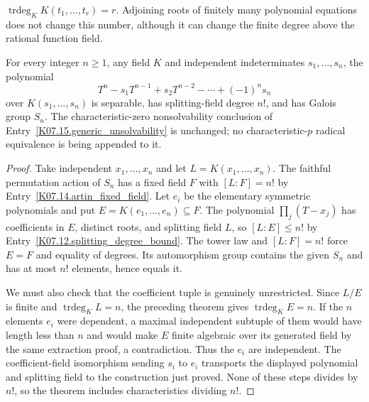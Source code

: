 \begin{example}
$\operatorname{trdeg}_K K(t_1,\ldots,t_r)=r$. Adjoining roots of finitely many polynomial equations does not change this number, although it can change the finite degree above the rational function field.
\end{example}

\begin{theorem}
For every integer $n\geq1$, any field $K$ and independent indeterminates $s_1,\ldots,s_n$, the polynomial
\[T^n-s_1T^{n-1}+s_2T^{n-2}-\cdots+(-1)^n s_n\]
over $K(s_1,\ldots,s_n)$ is separable, has splitting-field degree $n!$, and has Galois group $S_n$. The characteristic-zero nonsolvability conclusion of Entry~\ref{K07.15.generic_unsolvability} is unchanged; no characteristic-$p$ radical equivalence is being appended to it.
\end{theorem}
\begin{proof}
Take independent $x_1,\ldots,x_n$ and let $L=K(x_1,\ldots,x_n)$. The faithful permutation action of $S_n$ has a fixed field $F$ with $[L:F]=n!$ by Entry~\ref{K07.14.artin_fixed_field}. Let $e_i$ be the elementary symmetric polynomials and put $E=K(e_1,\ldots,e_n)\subseteq F$. The polynomial $\prod_j(T-x_j)$ has coefficients in $E$, distinct roots, and splitting field $L$, so $[L:E]\leq n!$ by Entry~\ref{K07.12.splitting_degree_bound}. The tower law and $[L:F]=n!$ force $E=F$ and equality of degrees. Its automorphism group contains the given $S_n$ and has at most $n!$ elements, hence equals it.

We must also check that the coefficient tuple is genuinely unrestricted. Since $L/E$ is finite and $\operatorname{trdeg}_K L=n$, the preceding theorem gives $\operatorname{trdeg}_K E=n$. If the $n$ elements $e_i$ were dependent, a maximal independent subtuple of them would have length less than $n$ and would make $E$ finite algebraic over its generated field by the same extraction proof, a contradiction. Thus the $e_i$ are independent. The coefficient-field isomorphism sending $s_i$ to $e_i$ transports the displayed polynomial and splitting field to the construction just proved. None of these steps divides by $n!$, so the theorem includes characteristics dividing $n!$.
\end{proof}
